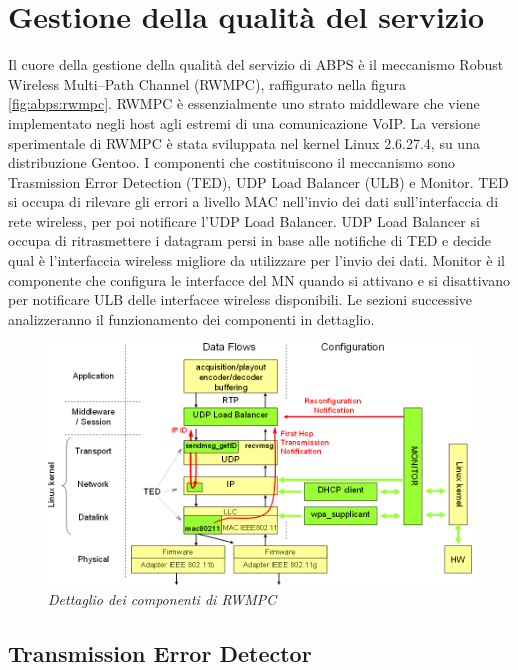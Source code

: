 \documentclass[12pt,a4paper,openright,twoside,draft]{book}
\begin{document}
\section{Gestione della qualità del servizio}

Il cuore della gestione della qualità del servizio di ABPS è il
meccanismo Robust Wireless Multi--Path Channel (RWMPC), raffigurato
nella figura \ref{fig:abps:rwmpc}. RWMPC è essenzialmente uno strato
middleware che viene implementato negli host agli estremi di una
comunicazione VoIP. La versione sperimentale di RWMPC è stata
sviluppata nel kernel Linux 2.6.27.4, su una distribuzione Gentoo. I
componenti che costituiscono il meccanismo sono Trasmission Error
Detection (TED), UDP Load Balancer (ULB) e Monitor. TED si occupa di
rilevare gli errori a livello MAC nell'invio dei dati sull'interfaccia
di rete wireless, per poi notificare l'UDP Load Balancer. UDP Load
Balancer si occupa di ritrasmettere i datagram persi in base alle
notifiche di TED e decide qual è l'interfaccia wireless migliore da
utilizzare per l'invio dei dati. Monitor è il componente che configura
le interfacce del MN quando si attivano e si disattivano per
notificare ULB delle interfacce wireless disponibili. Le sezioni
successive analizzeranno il funzionamento dei componenti in dettaglio.

\begin{figure}
  \centering
  \includegraphics[width=\textwidth]{img/abps-rwmpc-funzionamento}
  \caption{\em Dettaglio dei componenti di RWMPC}
  \label{fig:abps:rwmpc-funzionamento}
\end{figure}

\subsection{Transmission Error Detector}
\end{document}
